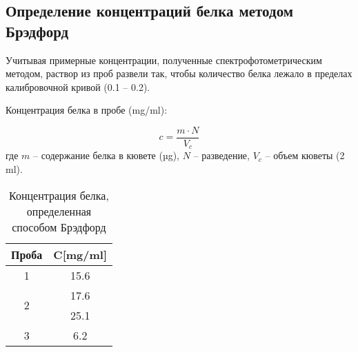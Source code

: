 \subsection{Определение концентраций белка методом Брэдфорд}

Учитывая примерные концентрации, полученные спектрофотометрическим методом,
раствор из проб развели так, чтобы количество белка лежало в пределах
калибровочной кривой (0.1 -- 0.2).

Концентрация белка в пробе (mg/ml):

$$ c = \frac{m \cdot N}{V_c} $$
где $m$ -- содержание белка в кювете (µg),
$N$ -- разведение,
$V_c$ -- объем кюветы (2 ml).

\begin{table}[htbp]
\caption{Концентрация белка, определенная способом Брэдфорд}
\begin{tabular}{|c|c|}
\hline
Проба & C[mg/ml] \\
\hline
1 & 15.6 \\
\hline
\multirow{2}{*}{2} & 17.6 \\
& 25.1 \\
\hline
3 & 6.2 \\
\hline
\end{tabular}
\label{table-bredford}
\end{table}

